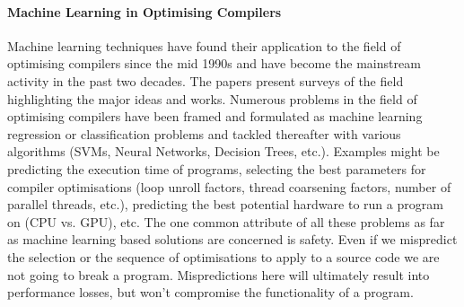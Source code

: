 \documentclass[10pt,a4paper]{report}
\begin{document}
\paragraph{Machine Learning in Optimising Compilers} Machine learning techniques have found their application to the field of optimising compilers since the mid 1990s and have become the mainstream activity in the past two decades. The papers \cite{ml-oboyle} \cite{Ashouri:2018:SCA:3271482.3197978} present surveys of the field highlighting the major ideas and works. Numerous problems in the field of optimising compilers have been framed and formulated as machine learning regression or classification problems and tackled thereafter with various algorithms (SVMs, Neural Networks, Decision Trees, etc.). Examples might be predicting the execution time of programs, selecting the best parameters for compiler optimisations (loop unroll factors, thread coarsening factors, number of parallel threads, etc.), predicting the best potential hardware to run a program on (CPU vs. GPU), etc. The one common attribute of all these problems as far as machine learning based solutions are concerned is safety. Even if we mispredict the selection or the sequence of optimisations to apply to a source code we are not going to break a program. Mispredictions here will ultimately result into performance losses, but won't compromise the functionality of a program.
\end{document}
